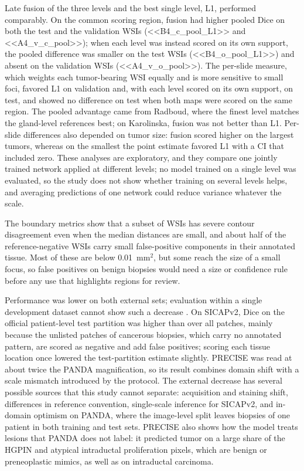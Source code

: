 \documentclass[10pt,letterpaper]{article}
\begin{document}
Late fusion of the three levels and the best single level, L1, performed comparably. On the common scoring region, fusion had higher pooled Dice on both the test and the validation WSIs (<<B4_c_pool_L1>> and <<A4_v_c_pool>>); when each level was instead scored on its own support, the pooled difference was smaller on the test WSIs (<<B4_o_pool_L1>>) and absent on the validation WSIs (<<A4_v_o_pool>>). The per-slide measure, which weights each tumor-bearing WSI equally and is more sensitive to small foci, favored L1 on validation and, with each level scored on its own support, on test, and showed no difference on test when both maps were scored on the same region. The pooled advantage came from Radboud, where the finest level matches the gland-level references best; on Karolinska, fusion was not better than L1. Per-slide differences also depended on tumor size: fusion scored higher on the largest tumors, whereas on the smallest the point estimate favored L1 with a CI that included zero. These analyses are exploratory, and they compare one jointly trained network applied at different levels; no model trained on a single level was evaluated, so the study does not show whether training on several levels helps, and averaging predictions of one network could reduce variance whatever the scale.

The boundary metrics show that a subset of WSIs has severe contour disagreement even when the median distances are small, and about half of the reference-negative WSIs carry small false-positive components in their annotated tissue. Most of these are below 0.01~mm$^2$, but some reach the size of a small focus, so false positives on benign biopsies would need a size or confidence rule before any use that highlights regions for review.

Performance was lower on both external sets; evaluation within a single development dataset cannot show such a decrease \cite{bib27,bib28,bib47}. On SICAPv2, Dice on the official patient-level test partition was higher than over all patches, mainly because the unlisted patches of cancerous biopsies, which carry no annotated pattern, are scored as negative and add false positives; scoring each tissue location once lowered the test-partition estimate slightly. PRECISE was read at about twice the PANDA magnification, so its result combines domain shift with a scale mismatch introduced by the protocol. The external decrease has several possible sources that this study cannot separate: acquisition and staining shift, differences in reference convention, single-scale inference for SICAPv2, and in-domain optimism on PANDA, where the image-level split leaves biopsies of one patient in both training and test sets. PRECISE also shows how the model treats lesions that PANDA does not label: it predicted tumor on a large share of the HGPIN and atypical intraductal proliferation pixels, which are benign or preneoplastic mimics, as well as on intraductal carcinoma.
\end{document}
